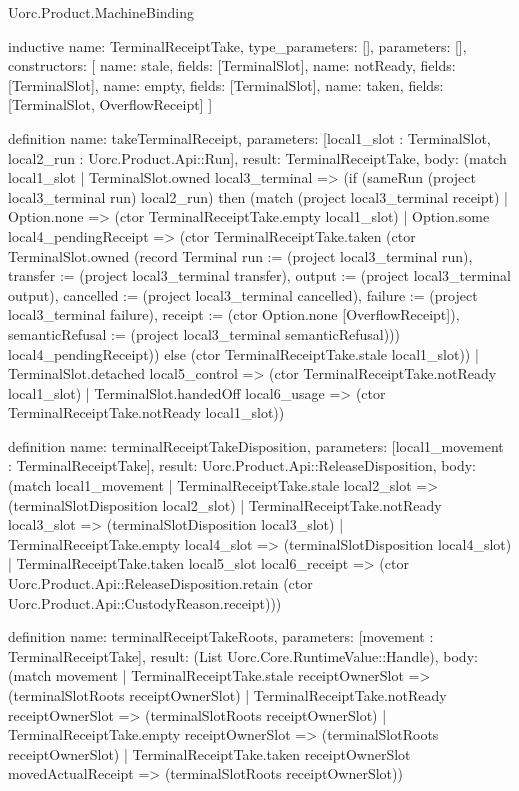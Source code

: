 \begin{lexlean}{Uorc.Product.MachineBinding}
\begin{semanticmodule}
inductive{
  name: TerminalReceiptTake,
  type_parameters: [],
  parameters: [],
  constructors: [
    {name: stale, fields: [TerminalSlot]},
    {name: notReady, fields: [TerminalSlot]},
    {name: empty, fields: [TerminalSlot]},
    {name: taken, fields: [TerminalSlot, OverflowReceipt]}
  ]
}

definition{
  name: takeTerminalReceipt,
  parameters: [local1_slot : TerminalSlot, local2_run : Uorc.Product.Api::Run],
  result: TerminalReceiptTake,
  body: (match local1_slot
    | TerminalSlot.owned local3_terminal => (if (sameRun (project local3_terminal run) local2_run) then (match (project local3_terminal receipt)
      | Option.none => (ctor TerminalReceiptTake.empty local1_slot)
      | Option.some local4_pendingReceipt => (ctor TerminalReceiptTake.taken (ctor TerminalSlot.owned (record Terminal {run := (project local3_terminal run), transfer := (project local3_terminal transfer), output := (project local3_terminal output), cancelled := (project local3_terminal cancelled), failure := (project local3_terminal failure), receipt := (ctor Option.none [OverflowReceipt]), semanticRefusal := (project local3_terminal semanticRefusal)})) local4_pendingReceipt)) else (ctor TerminalReceiptTake.stale local1_slot))
    | TerminalSlot.detached local5_control => (ctor TerminalReceiptTake.notReady local1_slot)
    | TerminalSlot.handedOff local6_usage => (ctor TerminalReceiptTake.notReady local1_slot))
}

definition{
  name: terminalReceiptTakeDisposition,
  parameters: [local1_movement : TerminalReceiptTake],
  result: Uorc.Product.Api::ReleaseDisposition,
  body: (match local1_movement
    | TerminalReceiptTake.stale local2_slot => (terminalSlotDisposition local2_slot)
    | TerminalReceiptTake.notReady local3_slot => (terminalSlotDisposition local3_slot)
    | TerminalReceiptTake.empty local4_slot => (terminalSlotDisposition local4_slot)
    | TerminalReceiptTake.taken local5_slot local6_receipt => (ctor Uorc.Product.Api::ReleaseDisposition.retain (ctor Uorc.Product.Api::CustodyReason.receipt)))
}

definition{
  name: terminalReceiptTakeRoots,
  parameters: [movement : TerminalReceiptTake],
  result: (List Uorc.Core.RuntimeValue::Handle),
  body: (match movement
    | TerminalReceiptTake.stale receiptOwnerSlot => (terminalSlotRoots receiptOwnerSlot)
    | TerminalReceiptTake.notReady receiptOwnerSlot => (terminalSlotRoots receiptOwnerSlot)
    | TerminalReceiptTake.empty receiptOwnerSlot => (terminalSlotRoots receiptOwnerSlot)
    | TerminalReceiptTake.taken receiptOwnerSlot movedActualReceipt => (terminalSlotRoots receiptOwnerSlot))
}
\end{semanticmodule}
\end{lexlean}
